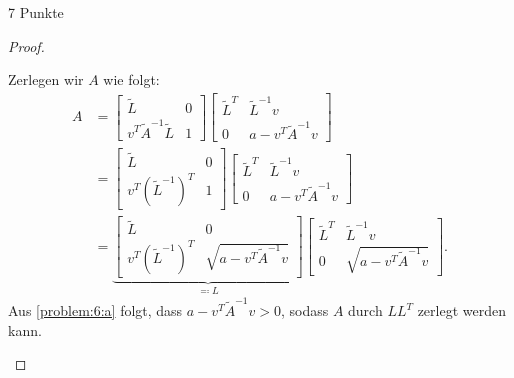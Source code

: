 \documentclass{problemset}
\begin{document}
\begin{problem}{7 Punkte}
\begin{proof}
\begin{enumerate}
              Zerlegen wir \( A \) wie folgt:
              \begin{align*}
                  A & =
                  \begin{bmatrix}
                      \tilde{L}                    & 0 \\
                      v^T \tilde{A}^{-1} \tilde{L} & 1
                  \end{bmatrix}
                  \begin{bmatrix}
                      \tilde{L}^T & \tilde{L}^{-1} v \\ 0 & a - v^T \tilde{A}^{-1} v
                  \end{bmatrix} \\
                    & =
                  \begin{bmatrix}
                      \tilde{L}                & 0 \\
                      v^T {(\tilde{L}^{-1})}^T & 1
                  \end{bmatrix}
                  \begin{bmatrix}
                      \tilde{L}^T & \tilde{L}^{-1} v \\ 0 & a - v^T \tilde{A}^{-1} v
                  \end{bmatrix} \\
                    & =
                  \underbrace{
                      \begin{bmatrix}
                          \tilde{L}                & 0                               \\
                          v^T {(\tilde{L}^{-1})}^T & \sqrt{a - v^T \tilde{A}^{-1} v}
                      \end{bmatrix}
                  }_{\eqcolon L}
                  \begin{bmatrix}
                      \tilde{L}^T & \tilde{L}^{-1} v \\ 0 & \sqrt{a - v^T \tilde{A}^{-1} v}
                  \end{bmatrix}.
              \end{align*}
              Aus \ref{problem:6:a} folgt, dass \( a - v^T \tilde{A}^{-1} v > 0
              \), sodass \( A \) durch \( LL^T \) zerlegt werden kann.
    \end{enumerate}
\end{proof}

\end{problem}
\end{document}
